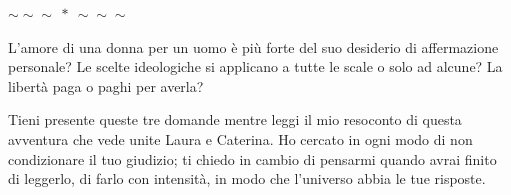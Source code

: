 \clearpage
\thispagestyle{empty}

\vspace*{\fill}

\begin{center}
{\Large $\sim\!\!\sim\!\!\sim\ \ast\ \sim\!\!\sim\!\!\sim$}
\vspace{2em}

\begin{minipage}{0.78\textwidth}
\itshape

L'amore di una donna per un uomo \`e pi\`u forte del suo desiderio di affermazione personale?
Le scelte ideologiche si applicano a tutte le scale o solo ad alcune?
La libertà paga o paghi per averla?

\medskip

Tieni presente queste tre domande mentre leggi il mio resoconto di questa avventura
che vede unite Laura e Caterina. Ho cercato in ogni modo di non condizionare il tuo
giudizio; ti chiedo in cambio di pensarmi quando avrai finito di leggerlo, di farlo
con intensità, in modo che l'universo abbia le tue risposte.

\end{minipage}
\end{center}

\vspace*{\fill}

\clearpage
